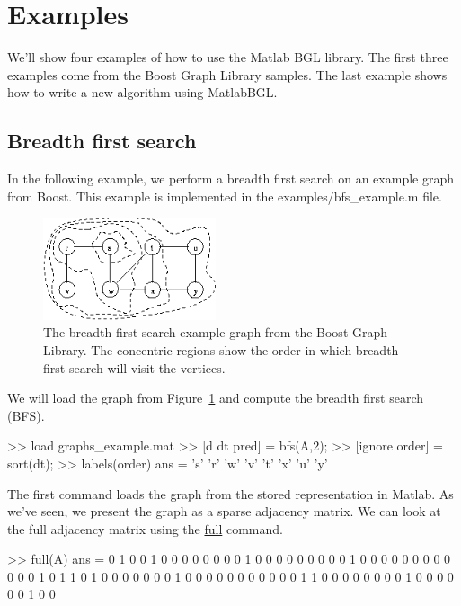 \documentclass[12pt]{article}
\newcommand{\mycmd}[1]{\url{#1}}
\newcommand{\mypath}[1]{{\ttfamily \small #1}}
\begin{document}
\section{Examples}
We'll show four examples of how to use the Matlab BGL library.  The first three examples come from the Boost Graph Library samples.  The last example shows how to write a new algorithm using MatlabBGL.

\subsection{Breadth first search}

In the following example, we perform a breadth first search on an example graph from Boost.  This example is implemented in the \mypath{examples/bfs\_example.m} file.

\begin{figure}[ht!]
\centering
\includegraphics[width=2in]{bfs_example}
\caption{The breadth first search example graph from the Boost Graph Library.  The concentric regions show the order in which breadth first search will visit the vertices.}
\label{fig:bfs}
\end{figure}

We will load the graph from Figure~\ref{fig:bfs} and compute the breadth first search (BFS).

\begin{mcode}
>> load graphs\bfs_example.mat
>> [d dt pred] = bfs(A,2);
>> [ignore order] = sort(dt);
>> labels(order)
ans = 
    's'
    'r'
    'w'
    'v'
    't'
    'x'
    'u'
    'y'
\end{mcode}

The first command loads the graph from the stored representation in Matlab.  As we've seen, we present the graph as a sparse adjacency matrix.  We can look at the full adjacency matrix using the \mycmd{full} command.

\begin{mcode}
>> full(A)
ans =
     0     1     0     0     1     0     0     0     0
     0     0     0     0     1     0     0     0     0
     0     0     0     0     0     1     0     0     0
     0     0     0     0     0     0     0     0     0
     1     0     1     1     0     1     0     0     0
     0     0     0     0     1     0     0     0     0
     0     0     0     0     0     0     0     1     1
     0     0     0     0     0     0     0     0     1
     0     0     0     0     0     0     1     0     0
\end{mcode}
\end{document}
